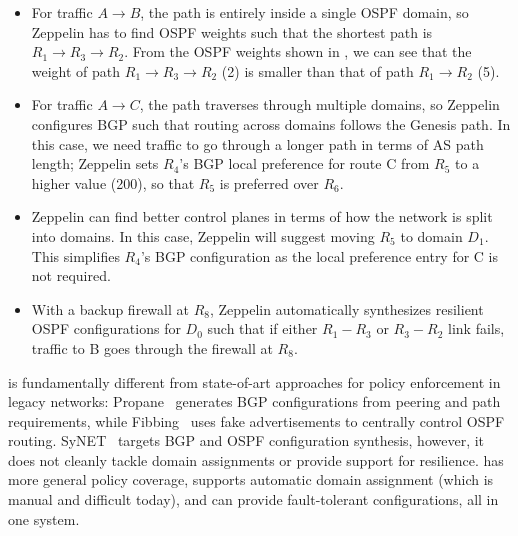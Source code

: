 \begin{itemize}
	\item
For traffic $A \rightarrow B$, the path is entirely inside
a single OSPF domain, so Zeppelin has to find OSPF weights 
such that the shortest path is $R_1 \rightarrow R_3 \rightarrow 
R_2$. From the OSPF weights shown in , 
we can see that the weight of path $R_1 
\rightarrow R_3 \rightarrow R_2$ (2) is smaller than that of path
$R_1 \rightarrow R_2$ (5). 
 	\item For traffic $A \rightarrow C$, the path traverses through 
 	multiple domains, so Zeppelin configures BGP such that 
 	routing across domains follows the Genesis path. In this case, 
 	we need traffic to go through a longer path in terms of AS path
 	length; Zeppelin sets $R_4$'s BGP local preference for route C
 	from $R_5$ to a higher value (200), so that $R_5$ is 
 	preferred over $R_6$. 
 	\item Zeppelin can find better control planes in terms of how 
 	the network is split into domains. In this case,  
 	Zeppelin will suggest moving $R_5$ to domain $D_1$. 
 	This simplifies $R_4$'s BGP configuration as the local preference 
 	entry for C is not required. 
 	\item With a backup firewall at $R_8$, 
 	Zeppelin automatically synthesizes resilient OSPF configurations
          for $D_0$ such that if either $R_1-R_3$ or $R_3-R_2$ link
          fails, traffic to B goes through the firewall at $R_8$.
\end{itemize}
\name is fundamentally different from state-of-art approaches for policy enforcement
in legacy networks: Propane~\cite{propane} generates BGP configurations
from peering and path requirements, while Fibbing~\cite{fibbing} uses fake
advertisements to centrally control OSPF routing. SyNET~\cite{synet} targets
BGP and OSPF configuration synthesis, however, it does not cleanly
tackle domain assignments or provide support for resilience. 
\name has more general policy coverage, supports automatic domain assignment 
(which is manual and difficult today), and can provide fault-tolerant configurations, all in one system.
